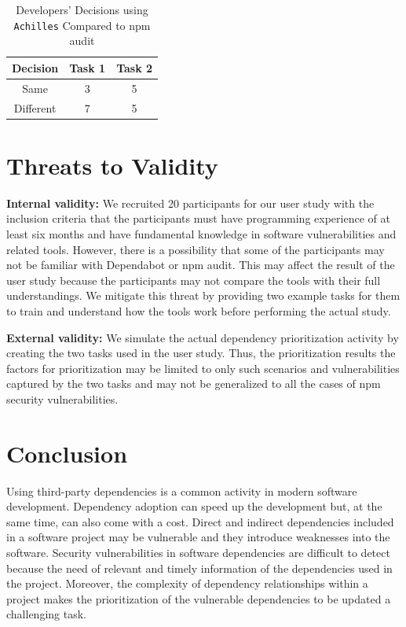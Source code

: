 \documentclass[conference]{IEEEtran}
\begin{document}
	\begin{table}[tb]
		\centering
		\caption{Developers' Decisions using \texttt{Achilles} Compared to npm audit}
		\begin{tabular}{ccc} 
			\toprule
			Decision & Task 1 & Task 2 \\
			\midrule
			Same & 3 & 5\\ 
			Different & 7 & 5 \\
			\bottomrule
		\end{tabular}
		\label{table:x3}
	\end{table}

	\section{Threats to Validity}
	\textbf{Internal validity:} We recruited 20 participants for our user study with the inclusion criteria that the participants must have programming experience of at least six months and have fundamental knowledge in software vulnerabilities and related tools. However, there is a possibility that some of the participants may not be familiar with Dependabot or npm audit. This may affect the result of the user study because the participants may not compare the tools with their full understandings. We mitigate this threat by providing two example tasks for them to train and understand how the tools work before performing the actual study. 
	
	\textbf{External validity:} We simulate the actual dependency prioritization activity by creating the two tasks used in the user study. Thus, the prioritization results the factors for prioritization may be limited to only such scenarios and vulnerabilities captured by the two tasks and may not be generalized to all the cases of npm security vulnerabilities.
	
	\section{Conclusion}
	Using third-party dependencies is a common activity in modern software development. Dependency adoption can speed up the development but, at the same time, can also come with a cost. Direct and indirect dependencies included in a software project may be vulnerable and they introduce weaknesses into the software. Security vulnerabilities in software dependencies are difficult to detect because the need of relevant and timely information of the dependencies used in the project. Moreover, the complexity of dependency relationships within a project makes the prioritization of the vulnerable dependencies to be updated a challenging task. 
	
\end{document}
